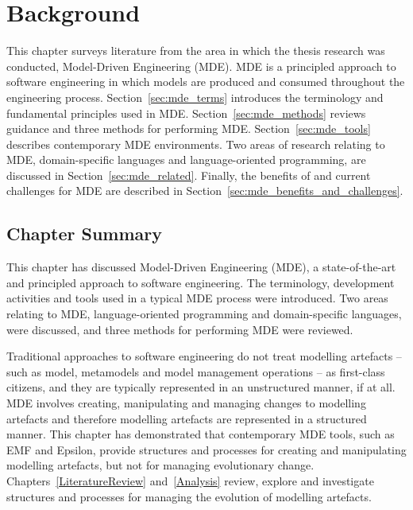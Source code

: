 
\chapter{Background}
\label{Background}
This chapter surveys literature from the area in which the thesis research was conducted, Model-Driven Engineering (MDE). MDE is a principled approach to software engineering in which models are produced and consumed throughout the engineering process. Section~\ref{sec:mde_terms} introduces the terminology and fundamental principles used in MDE. Section~\ref{sec:mde_methods} reviews guidance and three methods for performing MDE. Section~\ref{sec:mde_tools} describes contemporary MDE environments. Two areas of research relating to MDE, domain-specific languages and language-oriented programming, are discussed in Section~\ref{sec:mde_related}. Finally, the benefits of and current challenges for MDE are described in Section~\ref{sec:mde_benefits_and_challenges}.







\section{Chapter Summary}
This chapter has discussed Model-Driven Engineering (MDE), a state-of-the-art and principled approach to software engineering. The terminology, development activities and tools used in a typical MDE process were introduced. Two areas relating to MDE, language-oriented programming and domain-specific languages, were discussed, and three methods for performing MDE were reviewed.

Traditional approaches to software engineering do not treat modelling artefacts -- such as model, metamodels and model management operations -- as first-class citizens, and they are typically represented in an unstructured manner, if at all. MDE involves creating, manipulating and managing changes to modelling artefacts and therefore modelling artefacts are represented in a structured manner. This chapter has demonstrated that contemporary MDE tools, such as EMF and Epsilon, provide structures and processes for creating and manipulating modelling artefacts, but not for managing evolutionary change. Chapters~\ref{LiteratureReview} and~\ref{Analysis} review, explore and investigate structures and processes for managing the evolution of modelling artefacts.